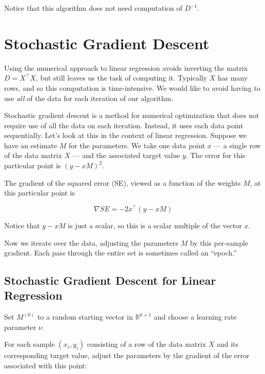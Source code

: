 \documentclass[
  11pt,
  letterpaper,
]{scrbook}
\newcommand{\R}{\mathbb{R}}
\theoremstyle{plain}
\theoremstyle{remark}
\begin{document}
Notice that this algorithm does not need computation of \(D^{-1}\).

\hypertarget{sec-sgd}{%
\section{Stochastic Gradient Descent}\label{sec-sgd}}

Using the numerical approach to linear regression avoids inverting the
matrix \(D=X^{\intercal}X\), but still leaves us the task of computing
it. Typically \(X\) has many rows, and so this computation is
time-intensive. We would like to avoid having to use \emph{all} of the
data for each iteration of our algorithm.

Stochastic gradient descent is a method for numerical optimization that
does not require use of all the data on each iteration. Instead, it uses
each data point sequentially. Let's look at this in the context of
linear regression. Suppose we have an estimate \(M\) for the parameters.
We take one data point \(x\) --- a single row of the data matrix \(X\)
--- and the associated target value \(y\). The error for this particular
point is \((y-xM)^2.\)

The gradient of the squared error (SE), viewed as a function of the
weights \(M\), at this particular point is

\[
\nabla SE = -2x^{\intercal}(y-xM)
\]

Notice that \(y-xM\) is just a scalar, so this is a scalar multiple of
the vector \(x\).

Now we iterate over the data, adjusting the parameters \(M\) by this
per-sample gradient. Each pass through the entire set is sometimes
called an ``epoch.''

\hypertarget{alg-stochastic-sgd}{}
\hypertarget{stochastic-gradient-descent-for-linear-regression}{%
\subsection{Stochastic Gradient Descent for Linear
Regression}\label{stochastic-gradient-descent-for-linear-regression}}

Set \(M^{(0)}\) to a random starting vector in \(\R^{k+1}\) and choose a
learning rate parameter \(\nu\).

For each sample \((x_{i},y_{i})\) consisting of a row of the data matrix
\(X\) and its corresponding target value, adjust the parameters by the
gradient of the error associated with this point:
\end{document}
